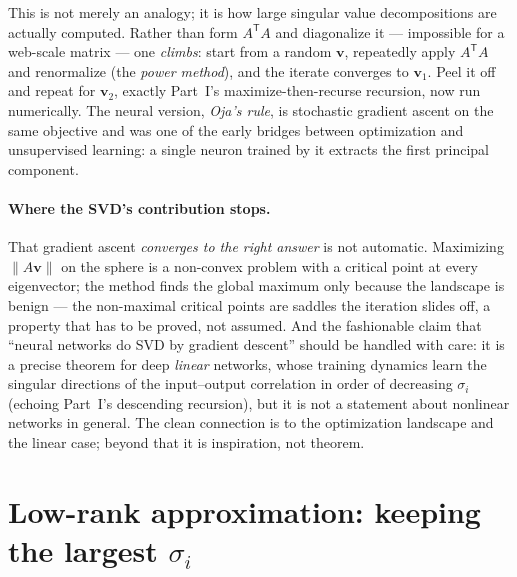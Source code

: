 \documentclass[11pt]{article}
\numberwithin{equation}{section}
\newcommand{\T}{^{\mathsf{T}}}
\newcommand{\vv}[1]{\mathbf{v}_{#1}}
\theoremstyle{plainish}
\begin{document}
This is not merely an analogy; it is how large singular value decompositions are
actually computed. Rather than form $A\T A$ and diagonalize it --- impossible for
a web-scale matrix --- one \emph{climbs}: start from a random $\mathbf{v}$,
repeatedly apply $A\T A$ and renormalize (the \emph{power method}), and the
iterate converges to $\vv1$. Peel it off and repeat for $\vv2$, exactly Part~I's
maximize-then-recurse recursion, now run numerically. The neural version,
\emph{Oja's rule}, is stochastic gradient ascent on the same objective and was
one of the early bridges between optimization and unsupervised learning: a single
neuron trained by it extracts the first principal component.

\paragraph{Where the SVD's contribution stops.} That gradient ascent
\emph{converges to the right answer} is not automatic. Maximizing $\|A\mathbf{v}\|$
on the sphere is a non-convex problem with a critical point at every eigenvector;
the method finds the global maximum only because the landscape is benign --- the
non-maximal critical points are saddles the iteration slides off, a property that
has to be proved, not assumed. And the fashionable claim that ``neural networks
do SVD by gradient descent'' should be handled with care: it is a precise theorem
for deep \emph{linear} networks, whose training dynamics learn the singular
directions of the input--output correlation in order of decreasing $\sigma_i$
(echoing Part~I's descending recursion), but it is not a statement about
nonlinear networks in general. The clean connection is to the optimization
landscape and the linear case; beyond that it is inspiration, not theorem.

\section{Low-rank approximation: keeping the largest \texorpdfstring{$\sigma_i$}{sigma}}
\label{sec:lowrank}
\end{document}
